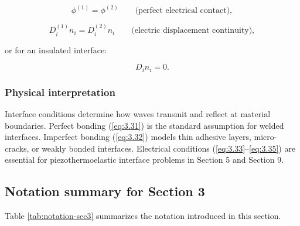 \begin{equation}
\phi^{(1)} = \phi^{(2)}
\qquad \text{(perfect electrical contact)},
\label{eq:3.33}
\end{equation}

\begin{equation}
D_i^{(1)}n_i = D_i^{(2)}n_i
\qquad \text{(electric displacement continuity)},
\label{eq:3.34}
\end{equation}

or for an insulated interface:

\begin{equation}
D_i n_i = 0.
\label{eq:3.35}
\end{equation}

\subsubsection{Physical interpretation}
Interface conditions determine how waves transmit and reflect at material boundaries. Perfect bonding (\eqref{eq:3.31}) is the standard assumption for welded interfaces. Imperfect bonding (\eqref{eq:3.32}) models thin adhesive layers, micro-cracks, or weakly bonded interfaces. Electrical conditions (\eqref{eq:3.33}--\eqref{eq:3.35}) are essential for piezothermoelastic interface problems in Section 5 and Section 9.



\subsection{Notation summary for Section 3}
\label{sec:3.10}

Table \ref{tab:notation-sec3} summarizes the notation introduced in this section.

